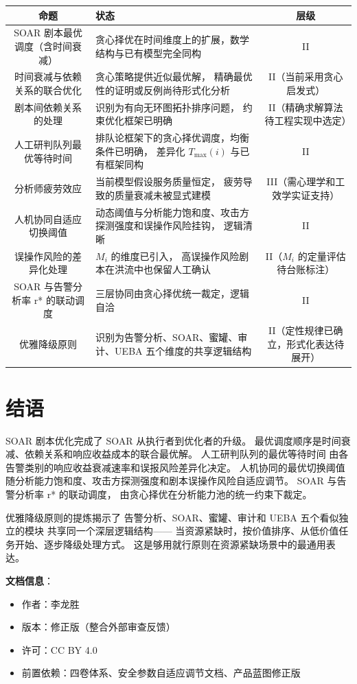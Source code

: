\documentclass[11pt,a4paper]{article}
\begin{document}
\begin{center}
\begin{xltabular}{\textwidth}{c|X|c}
\toprule
\textbf{命题} & \textbf{状态} & \textbf{层级} \\
\midrule
SOAR 剧本最优调度（含时间衰减） &
贪心择优在时间维度上的扩展，数学结构与已有模型完全同构 &
II \\
时间衰减与依赖关系的联合优化 &
贪心策略提供近似最优解，
精确最优性的证明或反例尚待形式化分析 &
II（当前采用贪心启发式） \\
剧本间依赖关系的处理 &
识别为有向无环图拓扑排序问题，
约束优化框架已明确 &
II（精确求解算法待工程实现中选定） \\
人工研判队列最优等待时间 &
排队论框架下的贪心择优调度，均衡条件已明确，
差异化 \(T_{\max}(i)\) 与已有框架同构 &
II \\
分析师疲劳效应 &
当前模型假设服务质量恒定，
疲劳导致的质量衰减未被显式建模 &
III（需心理学和工效学实证支持） \\
人机协同自适应切换阈值 &
动态阈值与分析能力饱和度、攻击方探测强度和误操作风险挂钩，
逻辑清晰 &
II \\
误操作风险的差异化处理 &
\(M_i\) 的维度已引入，
高误操作风险剧本在洪流中也保留人工确认 &
II（\(M_i\) 的定量评估待台账标注） \\
SOAR 与告警分析率 r* 的联动调度 &
三层协同由贪心择优统一裁定，逻辑自洽 &
II \\
优雅降级原则 &
识别为告警分析、SOAR、蜜罐、审计、UEBA
五个维度的共享逻辑结构 &
II（定性规律已确立，形式化表达待展开） \\
\bottomrule
\end{xltabular}
\end{center}

\section{结语}

SOAR 剧本优化完成了 SOAR 从执行者到优化者的升级。
最优调度顺序是时间衰减、依赖关系和响应收益成本的联合最优解。
人工研判队列的最优等待时间
由各告警类别的响应收益衰减速率和误报风险差异化决定。
人机协同的最优切换阈值
随分析能力饱和度、攻击方探测强度和剧本误操作风险自适应调节。
SOAR 与告警分析率 r* 的联动调度，
由贪心择优在分析能力池的统一约束下裁定。

优雅降级原则的提炼揭示了
告警分析、SOAR、蜜罐、审计和 UEBA
五个看似独立的模块
共享同一个深层逻辑结构——
当资源紧缺时，按价值排序、从低价值任务开始、逐步降级处理方式。
这是够用就行原则在资源紧缺场景中的最通用表达。

\vspace{5mm}
\noindent\textbf{文档信息}：
\begin{itemize}
    \item 作者：李龙胜
    \item 版本：修正版（整合外部审查反馈）
    \item 许可：CC BY 4.0
    \item 前置依赖：四卷体系、安全参数自适应调节文档、产品蓝图修正版
\end{itemize}
\end{document}
